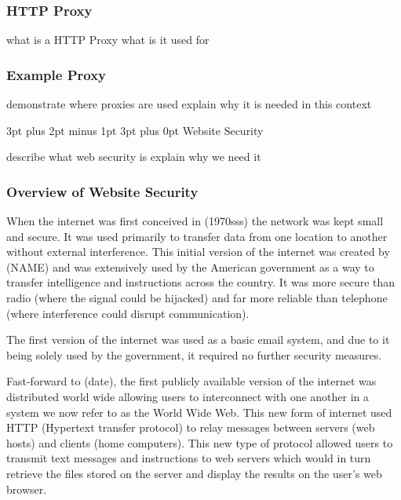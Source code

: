 \documentclass[12pt,a4paper]{article}
\makeatletter
\renewcommand\subsection{\@startsection {subsection}{1}{2mm} %
                               {3pt plus 2pt minus 1pt} %
                               {3pt plus 0pt} %
                               {\normalfont\bfseries}}
\makeatother
\begin{document}
\subsubsection{HTTP Proxy}

what is a HTTP Proxy
what is it used for

\subsubsection{Example Proxy}

demonstrate where proxies are used
explain why it is needed in this context

\newpage

\subsection{Website Security}

describe what web security is
explain why we need it

\subsubsection{Overview of Website Security}

When the internet was first conceived in (1970sss) the network was kept small and secure. It was used primarily to transfer data from one location to another without external interference. This initial version of the internet was created by (NAME) and was extensively used by the American government as a way to transfer intelligence and instructions across the country. It was more secure than radio (where the signal could be hijacked) and far more reliable than telephone (where interference could disrupt communication). 

The first version of the internet was used as a basic email system, and due to it being solely used by the government, it required no further security measures.

Fast-forward to (date), the first publicly available version of the internet was distributed world wide allowing users to interconnect with one another in a system we now refer to as the World Wide Web. This new form of internet used HTTP (Hypertext transfer protocol) to relay messages between servers (web hosts) and clients (home computers). This new type of protocol allowed users to transmit text messages and instructions to web servers which would in turn retrieve the files stored on the server and display the results on the user's web browser. 
\end{document}

